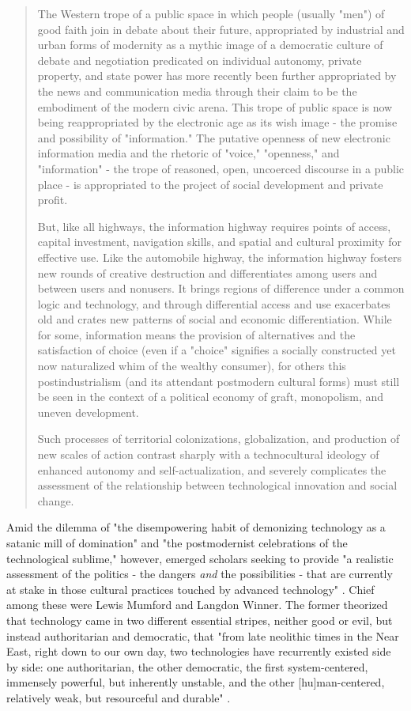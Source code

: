 \blockquote{The Western trope of a public space in which people (usually "men") of good faith join in debate about their future, appropriated by industrial and urban forms of modernity as a mythic image of a democratic culture of debate and negotiation predicated on individual autonomy, private property, and state power has more recently been further appropriated by the news and communication media through their claim to be the embodiment of the modern civic arena. This trope of public space is now being reappropriated by the electronic age as its wish image - the promise and possibility of "information." The putative openness of new electronic information media and the rhetoric of "voice," "openness," and "information" - the trope of reasoned, open, uncoerced discourse in a public place - is appropriated to the project of social development and private profit.

But, like all highways, the information highway requires points of access, capital investment, navigation skills, and spatial and cultural proximity for effective use. Like the automobile highway, the information highway fosters new rounds of creative destruction and differentiates among users and between users and nonusers. It brings regions of difference under a common logic and technology, and through differential access and use exacerbates old and crates new patterns of social and economic differentiation. While for some, information means the provision of alternatives and the satisfaction of choice (even if a "choice" signifies a socially constructed yet now naturalized whim of the wealthy consumer), for others this postindustrialism (and its attendant postmodern cultural forms) must still be seen in the context of a political economy of graft, monopolism, and uneven development.

Such processes of territorial colonizations, globalization, and production of new scales of action contrast sharply with a technocultural ideology of enhanced autonomy and self-actualization, and severely complicates the assessment of the relationship between technological innovation and social change.}

Amid the dilemma of "the disempowering habit of demonizing technology as a satanic mill of domination" and "the postmodernist celebrations of the technological sublime," however, emerged scholars seeking to provide "a realistic assessment of the politics - the dangers \textit{and} the possibilities - that are currently at stake in those cultural practices touched by advanced technology"  \cite{penleyTechnoculture1991}. Chief among these were Lewis Mumford and Langdon Winner. The former theorized that technology came in two different essential stripes, neither good or evil, but instead authoritarian and democratic, that "from late neolithic times in the Near East, right down to our own day, two technologies have recurrently existed side by side: one authoritarian, the other democratic, the first system-centered, immensely powerful, but inherently unstable, and the other [hu]man-centered, relatively weak, but resourceful and durable" \cite{mumfordAuthoritarianDemocraticTechnics1964}. 

